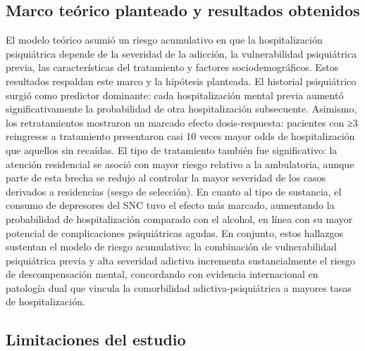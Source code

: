 \documentclass[
  spanish,
  10pt,
]{article}
\begin{document}
\subsection{Marco teórico planteado y resultados
obtenidos}\label{marco-teuxf3rico-planteado-y-resultados-obtenidos}

El modelo teórico asumió un riesgo acumulativo en que la hospitalización
psiquiátrica depende de la severidad de la adicción, la vulnerabilidad
psiquiátrica previa, las características del tratamiento y factores
sociodemográficos. Estos resultados respaldan este marco y la hipótesis
planteada. El historial psiquiátrico surgió como predictor dominante:
cada hospitalización mental previa aumentó significativamente la
probabilidad de otra hospitalización subsecuente. Asimismo, los
retratamientos mostraron un marcado efecto dosis-respuesta: pacientes
con ≥3 reingresos a tratamiento presentaron casi 10 veces mayor odds de
hospitalización que aquellos sin recaídas. El tipo de tratamiento
también fue significativo: la atención residencial se asoció con mayor
riesgo relativo a la ambulatoria, aunque parte de esta brecha se redujo
al controlar la mayor severidad de los casos derivados a residencias
(sesgo de selección). En cuanto al tipo de sustancia, el consumo de
depresores del SNC tuvo el efecto más marcado, aumentando la
probabilidad de hospitalización comparado con el alcohol, en línea con
su mayor potencial de complicaciones psiquiátricas agudas. En conjunto,
estos hallazgos sustentan el modelo de riesgo acumulativo: la
combinación de vulnerabilidad psiquiátrica previa y alta severidad
adictiva incrementa sustancialmente el riesgo de descompensación mental,
concordando con evidencia internacional en patología dual que vincula la
comorbilidad adictiva-psiquiátrica a mayores tasas de hospitalización.

\subsection{Limitaciones del estudio}\label{limitaciones-del-estudio}
\end{document}
